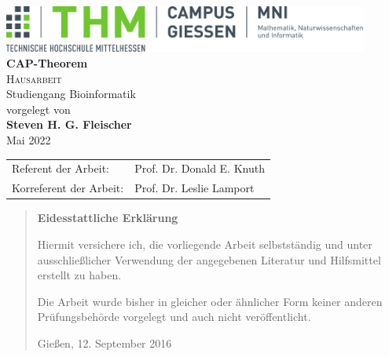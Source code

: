 \documentclass[%
	BCOR=8.25mm,         %
	DIV=12,              %
	parskip=half,				 %
	bibliography=totoc,	 %
	headsepline=on,      %
	]{scrbook}
\begin{document}
\frontmatter

\begin{titlepage}
	\begin{center}
	\includegraphics[width=0.9\textwidth]{img/mni-logo}\\[5cm]
	\textbf{\huge\sffamily CAP-Theorem}\\[2cm]
	\textsc{\Large Hausarbeit}\\Studiengang Bioinformatik\\[2cm]
	vorgelegt von\\
	\textbf{Steven H. G. Fleischer}\\ [1.5cm] 
	Mai 2022
	\end{center}
	\vfill
	\begin{tabular}{ll}
		Referent der Arbeit: & Prof. Dr. Donald E. Knuth\\ 
		Korreferent der Arbeit: & Prof. Dr. Leslie Lamport\\ 
	\end{tabular}
\end{titlepage}
\cleardoubleemptypage

\pagestyle{empty}
\begin{quote}
	\vspace*{4cm}

	\begin{center}
		\textbf{\Large\sffamily Eidesstattliche Erklärung}
	\end{center}

	Hiermit versichere ich, die vorliegende Arbeit selbstständig und unter
	ausschließlicher Verwendung der angegebenen Literatur und Hilfsmittel
	erstellt zu haben.

	Die Arbeit wurde bisher in gleicher oder ähnlicher Form keiner anderen
	Prüfungsbehörde vorgelegt und auch nicht veröffentlicht.

	\vspace{2em}

	Gießen, 12. September 2016
\end{quote}
\cleardoubleemptypage
\end{document}
